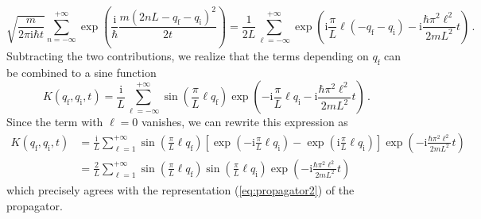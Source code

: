 \documentclass[11pt,DIV=19,parskip=half]{scrartcl}
\begin{document}
\begin{equation}
 \sqrt{\frac{m}{2\pi\text{i}\hbar t}} \sum_{n=-\infty}^{+\infty}\exp\!\left(\frac{\text{i}}{\hbar}
                 \frac{m(2nL-q_\text{f}-q_\text{i})^2}{2t}\right) = 
 \frac{1}{2L}\sum_{\ell=-\infty}^{+\infty}
    \exp\!\left(\text{i}\frac{\pi}{L}\ell(-q_\text{f}-q_\text{i})
       -\text{i}\frac{\hbar\pi^2\ell^2}{2mL^2}t\right)\,.
\end{equation}
Subtracting the two contributions, we realize that the terms depending on $q_\text{f}$ can be combined
to a sine function
\begin{equation}
 K(q_\text{f}, q_\text{i}, t) = \frac{\text{i}}{L}\sum_{\ell=-\infty}^{+\infty}
     \sin\!\left(\frac{\pi}{L}\ell q_\text{f}\right)
    \exp\!\left(-\text{i}\frac{\pi}{L}\ell q_\text{i}-\text{i}\frac{\hbar\pi^2\ell^2}{2mL^2}t\right)\,.
\end{equation}
Since the term with $\ell=0$ vanishes, we can rewrite this expression as
\begin{equation}
 \begin{aligned}
  K(q_\text{f}, q_\text{i}, t) &= \frac{\text{i}}{L}\sum_{\ell=1}^{+\infty}
      \sin\!\left(\frac{\pi}{L}\ell q_\text{f}\right)\left[
             \exp\!\left(-\text{i}\frac{\pi}{L}\ell q_\text{i}\right)
             -\exp\!\left(\text{i}\frac{\pi}{L}\ell q_\text{i}\right)\right]
     \exp\!\left(-\text{i}\frac{\hbar\pi^2\ell^2}{2mL^2}t\right)\\
  &= \frac{2}{L}\sum_{\ell=1}^{+\infty} \sin\!\left(\frac{\pi}{L}\ell q_\text{f}\right)
                                        \sin\!\left(\frac{\pi}{L}\ell q_\text{i}\right)
              \exp\!\left(-\text{i}\frac{\hbar\pi^2\ell^2}{2mL^2}t\right)
 \end{aligned}
\end{equation}
which precisely agrees with the representation (\ref{eq:propagator2}) of the propagator.
\end{document}
